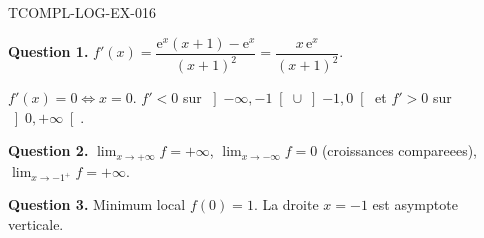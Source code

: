 \begin{corrige}{TCOMPL-LOG-EX-016}

\textbf{Question 1.} $f'(x) = \dfrac{\mathrm{e}^x(x+1) - \mathrm{e}^x}{(x+1)^2} = \dfrac{x\,\mathrm{e}^x}{(x+1)^2}$.


$f'(x) = 0 \iff x = 0$. $f' < 0$ sur $\left]-\infty, -1\right[ \cup \left]-1, 0\right[$ et $f' > 0$ sur $\left]0, +\infty\right[$.

\textbf{Question 2.} $\lim_{x \to +\infty} f = +\infty$, $\lim_{x \to -\infty} f = 0$ (croissances compareees), $\lim_{x \to -1^+} f = +\infty$.

\textbf{Question 3.} Minimum local $f(0) = 1$. La droite $x = -1$ est asymptote verticale.

\end{corrige}
